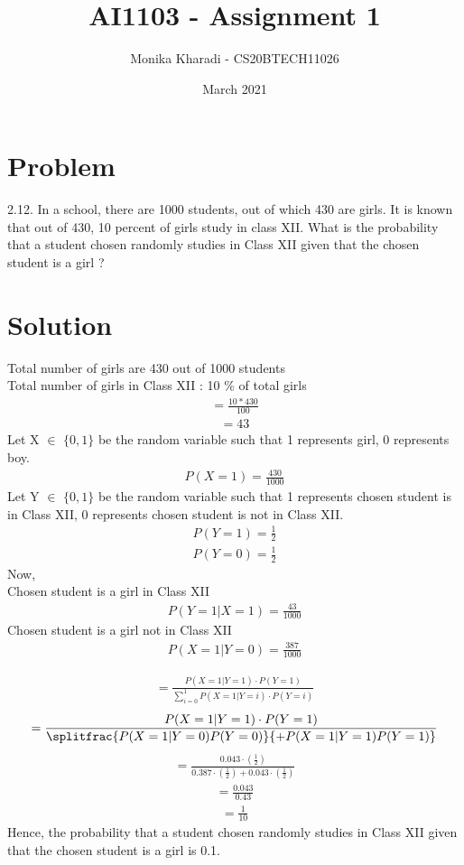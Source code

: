 \documentclass[journal,12pt,two column]{IEEEtran}
\title{AI1103 - Assignment 1}
\author{Monika Kharadi - CS20BTECH11026}
\date{March 2021}
\begin{document}
\maketitle

\section*{\large\textbf{Problem}}

2.12. In a school, there are 1000 students, out of which 430 are girls. It is known that out of 430, 10 percent of girls study in class XII. What is the probability that a student chosen randomly studies in Class XII given that the chosen student is a girl ?
{\section*{\textbf{Solution}}}
Total number of girls are 430 out of 1000 students \\
Total number of girls in Class XII : 10 \% of total girls 
\begin{align}
=\frac{10*430}{100} 
\end{align}
\begin{align}
= 43    
\end{align}
Let X $\in$ $\{0,1\}$ be the random variable such that 1 represents girl, 0 represents boy.
\begin{align}
P(X=1)= \frac{430}{1000}   
\end{align}
Let Y $\in$ $\{0,1\}$ be the random variable such that 1 represents chosen student is in Class XII, 0 represents chosen student is not in Class XII.
\begin{align}
P(Y=1)= \frac{1}{2}   
\end{align}
\begin{align}
P(Y=0)= \frac{1}{2}   
\end{align}
Now,\\
Chosen student is a girl in Class XII
\begin{align}    
P(Y=1\vert X=1)=\frac{43}{1000} 
\end{align}
Chosen student is a girl not in Class XII
\begin{align}
P(X=1\vert Y=0)=\frac{387}{1000}
\end{align}

\begin{align}    
=\frac{P(X=1\vert Y=1)\cdot P(Y=1)}{\sum_{i=0}^{1} P(X=1\vert Y=i)\cdot P(Y=i)}
\end{align}
\begin{align}
=\frac{P(X=1 \vert Y=1)\cdot P(Y=1)}{\splitfrac{P(X=1\vert Y=0)P(Y=0)}{+P(X=1\vert Y=1)P(Y=1)}}
\end{align}
\begin{align}
=\frac{0.043\cdot (\frac{1}{2})}{0.387\cdot (\frac{1}{2}) + 0.043\cdot (\frac{1}{2})} 
\end{align}
\begin{align}
=\frac{0.043}{0.43}    
\end{align}
\begin{align}
=\frac{1}{10}    
\end{align}
Hence, the probability that a student chosen randomly studies in Class XII given that the chosen student is a girl is 0.1.
\end{document}
